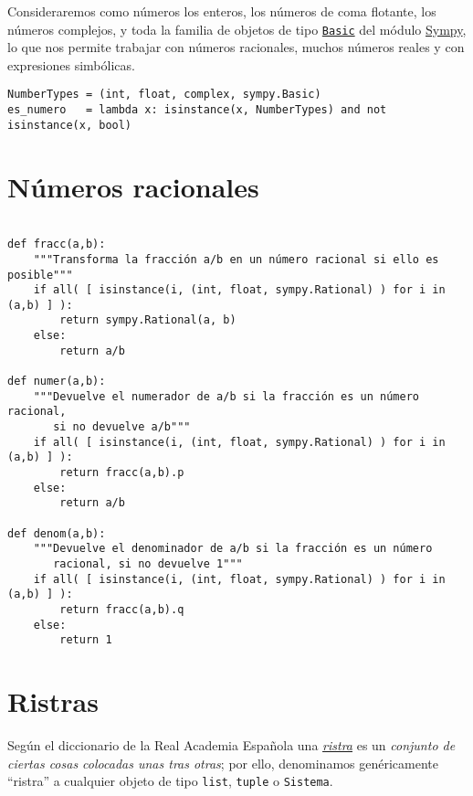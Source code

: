 \documentclass[11pt]{report}
\begin{document}
Consideraremos como números los enteros, los números de coma flotante,
los números complejos, y toda la familia de objetos de tipo \href{https://docs.sympy.org/latest/modules/core.html\#sympy.core.basic.Basic}{\texttt{Basic}}
del módulo \href{https://docs.sympy.org/latest/index.html}{Sympy}, lo que nos permite trabajar con números racionales,
muchos números reales y con expresiones simbólicas.
\begin{verbatim}
NumberTypes = (int, float, complex, sympy.Basic)
es_numero   = lambda x: isinstance(x, NumberTypes) and not isinstance(x, bool)
\end{verbatim}

\section{Números racionales}
\label{sec:org5ea9eae}

\begin{verbatim}

def fracc(a,b):
    """Transforma la fracción a/b en un número racional si ello es posible"""
    if all( [ isinstance(i, (int, float, sympy.Rational) ) for i in (a,b) ] ):
        return sympy.Rational(a, b)
    else:
        return a/b
    
def numer(a,b):
    """Devuelve el numerador de a/b si la fracción es un número racional,
       si no devuelve a/b"""
    if all( [ isinstance(i, (int, float, sympy.Rational) ) for i in (a,b) ] ):
        return fracc(a,b).p
    else:
        return a/b 

def denom(a,b):
    """Devuelve el denominador de a/b si la fracción es un número
       racional, si no devuelve 1"""
    if all( [ isinstance(i, (int, float, sympy.Rational) ) for i in (a,b) ] ):
        return fracc(a,b).q
    else:
        return 1

\end{verbatim}

\section{Ristras}
\label{sec:org7badd30}

Según el diccionario de la Real Academia Española una \href{https://dle.rae.es/ristra}{\emph{ristra}} es un
\emph{conjunto de ciertas cosas colocadas unas tras otras}; por ello,
denominamos genéricamente ``ristra'' a cualquier objeto de tipo
\texttt{list}, \texttt{tuple} o \texttt{Sistema}.
\end{document}
